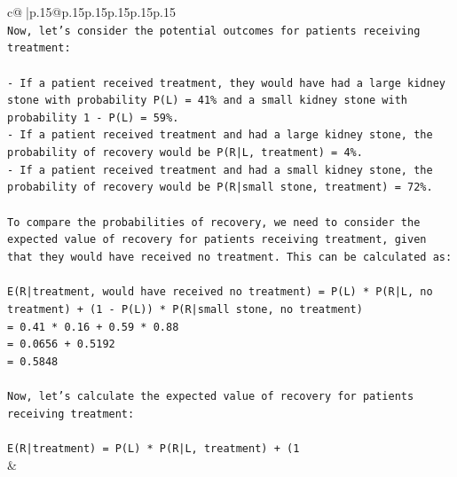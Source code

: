 \documentclass{article}
\begin{document}
{\begin{supertabular}{c@{$\;$}|p{.15\linewidth}@{}p{.15\linewidth}p{.15\linewidth}p{.15\linewidth}p{.15\linewidth}p{.15\linewidth}}
{{{\\ 
\texttt{Now, let's consider the potential outcomes for patients receiving treatment:} \\
\\ 
\texttt{{-} If a patient received treatment, they would have had a large kidney stone with probability P(L) = 41\% and a small kidney stone with probability 1 {-} P(L) = 59\%.} \\
\texttt{{-} If a patient received treatment and had a large kidney stone, the probability of recovery would be P(R|L, treatment) = 4\%.} \\
\texttt{{-} If a patient received treatment and had a small kidney stone, the probability of recovery would be P(R|small stone, treatment) = 72\%.} \\
\\ 
\texttt{To compare the probabilities of recovery, we need to consider the expected value of recovery for patients receiving treatment, given that they would have received no treatment. This can be calculated as:} \\
\\ 
\texttt{E(R|treatment, would have received no treatment) = P(L) * P(R|L, no treatment) + (1 {-} P(L)) * P(R|small stone, no treatment)} \\
\texttt{= 0.41 * 0.16 + 0.59 * 0.88} \\
\texttt{= 0.0656 + 0.5192} \\
\texttt{= 0.5848} \\
\\ 
\texttt{Now, let's calculate the expected value of recovery for patients receiving treatment:} \\
\\ 
\texttt{E(R|treatment) = P(L) * P(R|L, treatment) + (1} \\
            }
        }
    }
    & \\ \\


\end{supertabular}}
\end{document}
